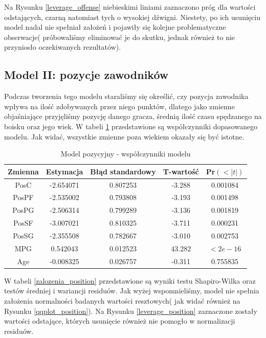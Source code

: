 \documentclass[11pt,a4paper]{article}
\begin{document}
Na Rysunku \ref{leverage_offense} niebieskimi liniami zaznaczono próg dla wartości odstających, czarną natomiast tych o wysokiej dźwigni. Niestety, po ich usunięciu model nadal nie spełniał założeń i pojawiły się kolejne problematyczne obserwacje( próbowaliśmy eliminować je do skutku, jednak również to nie przyniosło oczekiwanych rezultatów).
\subsection{Model II: pozycje zawodników}
Podczas tworzenia tego modelu staraliśmy się określić, czy pozycja zawodnika wpływa na ilość zdobywanych przez niego punktów, dlatego jako zmienne objaśniające przyjęliśmy pozycję danego gracza, średnią ilość czasu spędzanego na boisku oraz jego wiek. W tabeli \ref{position} przedstawione są współczynniki dopasowanego modelu. Jak widać, wszystkie zmienne poza wiekiem okazały się być istotne. 
\begin{table}[H]
	\begin{center}
		\begin{tabular}{| c | c | c | c | c |}
			\hline
			Zmienna & Estymacja & Błąd standardowy & T-wartość & Pr$(<|t|)$\\ \hline
			PosC & -2.654071 &  0.807253 & -3.288 & 0.001084 \\ \hline
			PosPF &-2.535002 &  0.793808 & -3.193 & 0.001498 \\ \hline
			PosPG &-2.506314 &  0.799289 & -3.136 &  0.001819 \\ \hline
			PosSF &-3.007021 &  0.810325 & -3.711 & 0.000231\\ \hline
			PosSG &-2.355508 &  0.782667 & -3.010 & 0.002753 \\ \hline
			MPG   & 0.542043 &  0.012523 & 43.282 & $< 2e-16$\\ \hline
			Age   &-0.008325 &  0.026757 & -0.311 & 0.755835 \\ \hline
		\end{tabular}
		\caption{Model pozycyjny - współczynniki modelu}
		\label{position}
	\end{center}
\end{table}
W tabeli \ref{zalozenia_position} przedstawione są wyniki testu Shapiro-Wilka oraz testów średniej i wariancji residuów. Jak wyżej wspomnieliśmy, model nie spełnia założenia normalności badanych wartości resztowych( jak widać również na Rysunku \ref{qqplot_position}). Na Rysunku \ref{leverage_position} zaznaczone zostały wartości odstające, których usunięcie również nie pomogło w normalizacji residuów.
\end{document}
